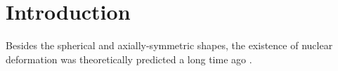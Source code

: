 \chapter{Introduction}

Besides the spherical and axially-symmetric shapes, the existence of nuclear deformation was theoretically predicted a long time ago \cite{bohr1998nuclear}.